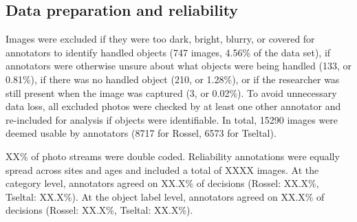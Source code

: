 \documentclass[10pt, letterpaper]{article}
\begin{document}
\hypertarget{data-preparation-and-reliability}{%
\subsection{Data preparation and
reliability}\label{data-preparation-and-reliability}}

Images were excluded if they were too dark, bright, blurry, or covered
for annotators to identify handled objects (747 images, 4.56\% of the
data set), if annotators were otherwise unsure about what objects were
being handled (133, or 0.81\%), if there was no handled object (210, or
1.28\%), or if the researcher was still present when the image was
captured (3, or 0.02\%). To avoid unnecessary data loss, all excluded
photos were checked by at least one other annotator and re-included for
analysis if objects were identifiable. In total, 15290 images were
deemed usable by annotators (8717 for Rossel, 6573 for Tseltal).

XX\% of photo streams were double coded. Reliability annotations were
equally spread across sites and ages and included a total of XXXX
images. At the category level, annotators agreed on XX.X\% of decisions
(Rossel: XX.X\%, Tseltal: XX.X\%). At the object label level, annotators
agreed on XX.X\% of decisions (Rossel: XX.X\%, Tseltal: XX.X\%).
\end{document}

